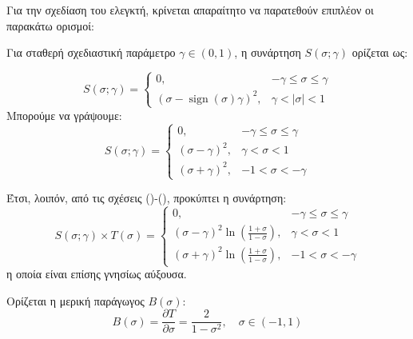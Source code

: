 Για την σχεδίαση του ελεγκτή, κρίνεται απαραίτητο να παρατεθούν επιπλέον οι παρακάτω ορισμοί:
\bigskip
\begin{definition} \label{Sigma_function_def}
Για σταθερή σχεδιαστική παράμετρο \( \gamma \in (0, 1) \), η συνάρτηση \( S(\sigma; \gamma) \) ορίζεται ως:

\begin{equation}
  S(\sigma; \gamma) =
  \begin{cases}
    0,                                               & -\gamma \leq \sigma \leq \gamma \\[0.3cm]
    (\sigma - \operatorname{sign}(\sigma) \gamma)^2, & \gamma < |\sigma| < 1
  \end{cases} \nonumber
\end{equation}
Μπορούμε να γράψουμε:
\begin{equation}
  S(\sigma; \gamma) =
  \begin{cases}
    0,                   & -\gamma \leq \sigma \leq \gamma \\[0.3cm]
    (\sigma - \gamma)^2, & \gamma < \sigma < 1             \\[0.3cm]
    (\sigma + \gamma)^2, & -1 < \sigma < -\gamma
  \end{cases}\label{Sigma_function}
\end{equation}
\end{definition}

Έτσι, λοιπόν, από τις σχέσεις ()-(), προκύπτει η συνάρτηση:
\begin{equation*}
  S(\sigma; \gamma) \times T(\sigma) =
  \begin{cases}
    0,                                      & -\gamma \leq \sigma \leq \gamma \\[0.3cm]
    (\sigma - \gamma)^2 \ln\left( \frac{1 + \sigma}{1 - \sigma} \right), & \gamma < \sigma < 1 \\[0.3cm]
    (\sigma + \gamma)^2 \ln\left( \frac{1 + \sigma}{1 - \sigma} \right), & -1 < \sigma < -\gamma
  \end{cases}
\end{equation*}
η οποία είναι επίσης γνησίως αύξουσα.

\bigskip
\begin{definition} \label{B_function_def}
Oρίζεται η μερική παράγωγος \( B(\sigma) \):
\begin{equation}
  B(\sigma) = \frac{\partial T}{\partial \sigma} = \frac{2}{1 - \sigma^2}, \quad \sigma \in (-1, 1) \label{B_function}
\end{equation}
\end{definition}

